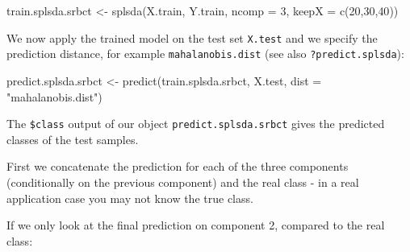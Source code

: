 \documentclass[
]{book}
\newenvironment{Shaded}{\begin{snugshade}}{\end{snugshade}}
\newcommand{\AttributeTok}[1]{\textcolor[rgb]{0.77,0.63,0.00}{#1}}
\newcommand{\CommentTok}[1]{\textcolor[rgb]{0.56,0.35,0.01}{\textit{#1}}}
\newcommand{\DecValTok}[1]{\textcolor[rgb]{0.00,0.00,0.81}{#1}}
\newcommand{\FunctionTok}[1]{\textcolor[rgb]{0.00,0.00,0.00}{#1}}
\newcommand{\NormalTok}[1]{#1}
\newcommand{\OtherTok}[1]{\textcolor[rgb]{0.56,0.35,0.01}{#1}}
\newcommand{\SpecialCharTok}[1]{\textcolor[rgb]{0.00,0.00,0.00}{#1}}
\newcommand{\StringTok}[1]{\textcolor[rgb]{0.31,0.60,0.02}{#1}}
\begin{document}
\begin{Shaded}
\begin{Highlighting}[]
\NormalTok{train.splsda.srbct }\OtherTok{\textless{}{-}} \FunctionTok{splsda}\NormalTok{(X.train, Y.train, }\AttributeTok{ncomp =} \DecValTok{3}\NormalTok{, }\AttributeTok{keepX =} \FunctionTok{c}\NormalTok{(}\DecValTok{20}\NormalTok{,}\DecValTok{30}\NormalTok{,}\DecValTok{40}\NormalTok{))}
\end{Highlighting}
\end{Shaded}

We now apply the trained model on the test set \texttt{X.test} and we specify the prediction distance, for example \texttt{mahalanobis.dist} (see also \texttt{?predict.splsda}):

\begin{Shaded}
\begin{Highlighting}[]
\NormalTok{predict.splsda.srbct }\OtherTok{\textless{}{-}} \FunctionTok{predict}\NormalTok{(train.splsda.srbct, X.test, }
                                \AttributeTok{dist =} \StringTok{"mahalanobis.dist"}\NormalTok{)}
\end{Highlighting}
\end{Shaded}

The \texttt{\$class} output of our object \texttt{predict.splsda.srbct} gives the predicted classes of the test samples.

First we concatenate the prediction for each of the three components (conditionally on the previous component) and the real class - in a real application case you may not know the true class.

\begin{Shaded}
\end{Shaded}

If we only look at the final prediction on component 2, compared to the real class:

\begin{Shaded}
\end{Shaded}
\end{document}
